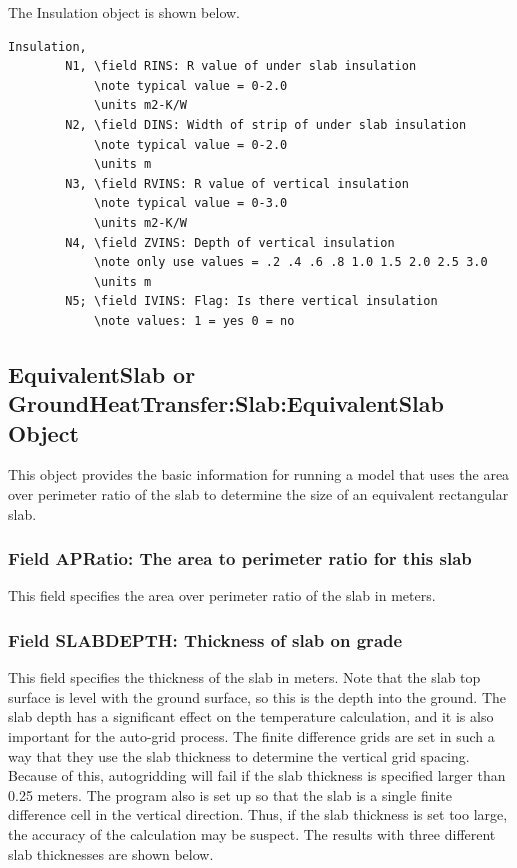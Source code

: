 The Insulation object is shown below.

\begin{lstlisting}
Insulation,
        N1, \field RINS: R value of under slab insulation
            \note typical value = 0-2.0
            \units m2-K/W
        N2, \field DINS: Width of strip of under slab insulation
            \note typical value = 0-2.0
            \units m
        N3, \field RVINS: R value of vertical insulation
            \note typical value = 0-3.0
            \units m2-K/W
        N4, \field ZVINS: Depth of vertical insulation
            \note only use values = .2 .4 .6 .8 1.0 1.5 2.0 2.5 3.0
            \units m
        N5; \field IVINS: Flag: Is there vertical insulation
            \note values: 1 = yes 0 = no
\end{lstlisting}

\subsection{EquivalentSlab or GroundHeatTransfer:Slab:EquivalentSlab Object}\label{equivalentslab-or-groundheattransferslabequivalentslab-object}

This object provides the basic information for running a model that uses the area over perimeter ratio of the slab to determine the size of an equivalent rectangular slab.

\subsubsection{Field APRatio: The area to perimeter ratio for this slab}\label{field-apratio-the-area-to-perimeter-ratio-for-this-slab-000}

This field specifies the area over perimeter ratio of the slab in meters.

\subsubsection{Field SLABDEPTH: Thickness of slab on grade}\label{field-slabdepth-thickness-of-slab-on-grade}

This field specifies the thickness of the slab in meters. Note that the slab top surface is level with the ground surface, so this is the depth into the ground. The slab depth has a significant effect on the temperature calculation, and it is also important for the auto-grid process. The finite difference grids are set in such a way that they use the slab thickness to determine the vertical grid spacing. Because of this, autogridding will fail if the slab thickness is specified larger than 0.25 meters. The program also is set up so that the slab is a single finite difference cell in the vertical direction. Thus, if the slab thickness is set too large, the accuracy of the calculation may be suspect. The results with three different slab thicknesses are shown below.

